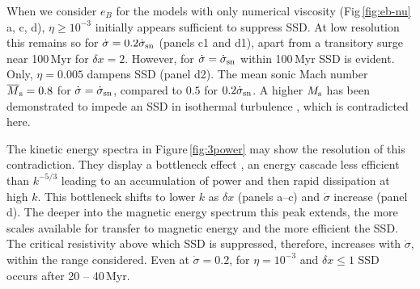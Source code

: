\documentclass[preprint2]{aastex63}
\newcommand\SNr{\dot\sigma_{\rm sn}}
\newcommand\Ms{M_{\rm s}}
\newcommand\dx{ {\delta x}}
\begin{document}
 {When we consider $e_B$ for the models {with} only numerical
 viscosity
 (Fig\,\ref{fig:eb-nu} a, c, d), $\eta\geq10^{-3}$ initially appears
 sufficient to suppress SSD.
 At low resolution this remains so for $\dot\sigma=0.2\SNr$ (panels c1 and d1),
 apart from a transitory surge near 100\,Myr for $\dx=2$.
 However, for $\dot\sigma=\SNr$ within 100\,Myr SSD is evident.
 Only, $\eta=0.005$ dampens SSD (panel d2).}
 The mean sonic Mach number $\overline\Ms=0.8$ for $\dot\sigma=\SNr$, compared
 to $0.5$ for $0.2\SNr$.
 A higher $\Ms$ has been demonstrated to impede an SSD in isothermal turbulence
 \citep{Haugen:2004M}, which is contradicted here.

 {The kinetic energy spectra in Figure\,\ref{fig:3power}} may
 show the resolution of this contradiction.
 They display a bottleneck effect \citep{Falkovich94,HBD03}, an energy cascade
 less efficient than $k^{-5/3}$
 leading to an accumulation of power and then rapid dissipation at high $k$.
 This bottleneck shifts to lower $k$ as $\dx$
 {(panels a--c) and $\dot\sigma$ increase (panel d).}
 {The deeper into the magnetic energy spectrum this peak extends, the more 
 scales available for transfer to magnetic energy and the more
 efficient the SSD.
 The critical resistivity above which SSD is suppressed, therefore, 
 increases with $\dot\sigma$, within the range considered. 
 Even at $\dot\sigma=0.2$, for $\eta=10^{-3}$ and $\dx\leq1$ SSD occurs after
 20 -- 40\,Myr.}
\end{document}
